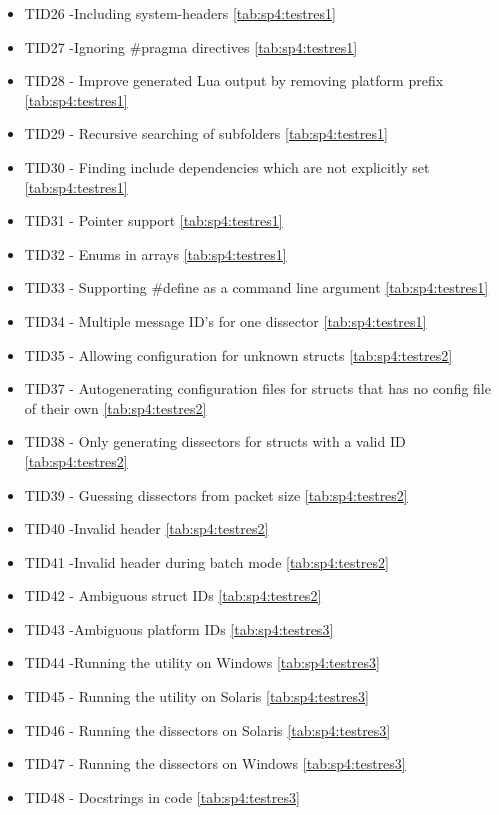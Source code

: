 \begin{itemize}
	\item TID26 -Including system-headers \autoref{tab:sp4:testres1}
	\item TID27 -Ignoring \#pragma directives \autoref{tab:sp4:testres1}
	\item TID28 - Improve generated Lua output by removing platform prefix \autoref{tab:sp4:testres1}
	\item TID29 - Recursive searching of subfolders \autoref{tab:sp4:testres1}
	\item TID30 - Finding include dependencies which are not explicitly set \autoref{tab:sp4:testres1}
	\item TID31 - Pointer support \autoref{tab:sp4:testres1}
	\item TID32 - Enums in arrays \autoref{tab:sp4:testres1}
	\item TID33 - Supporting \#define as a command line argument \autoref{tab:sp4:testres1}
	\item TID34 - Multiple message ID's for one dissector \autoref{tab:sp4:testres1}
	\item TID35 - Allowing configuration for unknown structs \autoref{tab:sp4:testres2}
	\item TID37 - Autogenerating configuration files for structs that has no config file of their own \autoref{tab:sp4:testres2}
	\item TID38 - Only generating dissectors for structs with a valid ID \autoref{tab:sp4:testres2}
	\item TID39 - Guessing dissectors from packet size \autoref{tab:sp4:testres2}
	\item TID40 -Invalid header \autoref{tab:sp4:testres2}
	\item TID41 -Invalid header during batch mode \autoref{tab:sp4:testres2}
	\item TID42 - Ambiguous struct IDs \autoref{tab:sp4:testres2}
	\item TID43 -Ambiguous platform IDs \autoref{tab:sp4:testres3}
	\item TID44 -Running the utility on Windows \autoref{tab:sp4:testres3}
	\item TID45 - Running the utility on Solaris \autoref{tab:sp4:testres3}
	\item TID46 - Running the dissectors on Solaris \autoref{tab:sp4:testres3}
	\item TID47 - Running the dissectors on Windows \autoref{tab:sp4:testres3}
	\item TID48 - Docstrings in code \autoref{tab:sp4:testres3}
\end{itemize}

